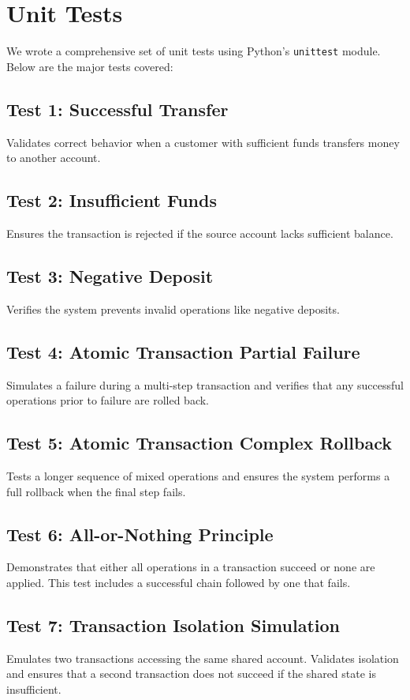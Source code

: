 \documentclass[a4paper,12pt]{article}
\begin{document}
\newpage
\section*{Unit Tests}

We wrote a comprehensive set of unit tests using Python's \texttt{unittest} module. Below are the major tests covered:

\subsection*{Test 1: Successful Transfer}
Validates correct behavior when a customer with sufficient funds transfers money to another account.

\subsection*{Test 2: Insufficient Funds}
Ensures the transaction is rejected if the source account lacks sufficient balance.

\subsection*{Test 3: Negative Deposit}
Verifies the system prevents invalid operations like negative deposits.

\subsection*{Test 4: Atomic Transaction Partial Failure}
Simulates a failure during a multi-step transaction and verifies that any successful operations prior to failure are rolled back.

\subsection*{Test 5: Atomic Transaction Complex Rollback}
Tests a longer sequence of mixed operations and ensures the system performs a full rollback when the final step fails.

\subsection*{Test 6: All-or-Nothing Principle}
Demonstrates that either all operations in a transaction succeed or none are applied. This test includes a successful chain followed by one that fails.

\subsection*{Test 7: Transaction Isolation Simulation}
Emulates two transactions accessing the same shared account. Validates isolation and ensures that a second transaction does not succeed if the shared state is insufficient.
\end{document}
